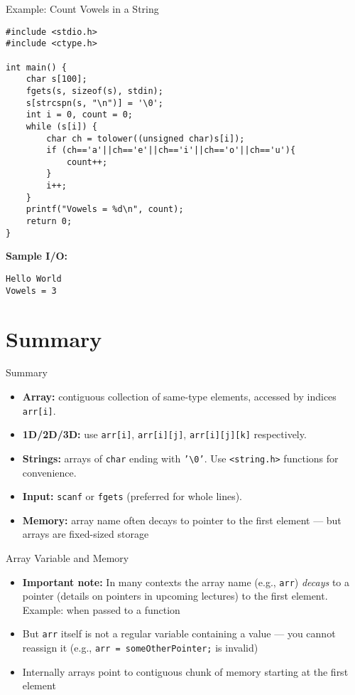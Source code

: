 \documentclass[12pt, aspectratio=169]{beamer}
\begin{document}
    \begin{frame}[fragile]{Example: Count Vowels in a String}
        \begin{verbatim}
#include <stdio.h>
#include <ctype.h>

int main() {
    char s[100];
    fgets(s, sizeof(s), stdin);
    s[strcspn(s, "\n")] = '\0';
    int i = 0, count = 0;
    while (s[i]) {
        char ch = tolower((unsigned char)s[i]);
        if (ch=='a'||ch=='e'||ch=='i'||ch=='o'||ch=='u'){
            count++;
        }
        i++;
    }
    printf("Vowels = %d\n", count);
    return 0;
}
        \end{verbatim}

        \textbf{Sample I/O:}
        \begin{verbatim}
Hello World
Vowels = 3
        \end{verbatim}
    \end{frame}


    \section{Summary}


    \begin{frame}{Summary}
        \begin{itemize}
            \item \textbf{Array:} contiguous collection of same-type elements, accessed by indices \texttt{arr[i]}.
            \item \textbf{1D/2D/3D:} use \texttt{arr[i]}, \texttt{arr[i][j]}, \texttt{arr[i][j][k]} respectively.
            \item \textbf{Strings:} arrays of \texttt{char} ending with \texttt{'\textbackslash0'}. Use \texttt{<string.h>} functions for convenience.
            \item \textbf{Input:} \texttt{scanf} or \texttt{fgets} (preferred for whole lines).
            \item \textbf{Memory:} array name often decays to pointer to the first element — but arrays are fixed-sized storage
        \end{itemize}
    \end{frame}


    \begin{frame}{Array Variable and Memory}
        \begin{itemize}
            \item \textbf{Important note:} In many contexts the array name (e.g., \texttt{arr}) \emph{decays} to a pointer (details on pointers in upcoming lectures) to the first element. Example: when passed to a function
            \item But \texttt{arr} itself is not a regular variable containing a value — you cannot reassign it (e.g., \texttt{arr = someOtherPointer;} is invalid)
            \item Internally arrays point to contiguous chunk of memory starting at the first element
        \end{itemize}
    \end{frame}
\end{document}

